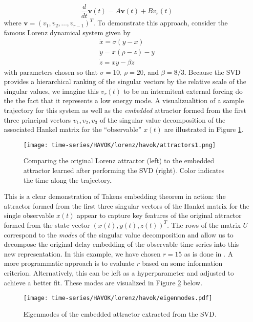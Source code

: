 \begin{equation}
  \frac{d}{dt}\mathbf{v}(t) = A\mathbf{v}(t) + Bv_r(t)
\end{equation}
where $\mathbf{v} = \left(v_1, v_2, ..., v_{r-1}\right)^T$. To demonstrate this approach, consider the famous Lorenz dynamical system given by
\begin{align}
  \dot{x} = \sigma(y-x) \\
  \dot{y} = x(\rho-z) -y \\
  \dot{z} = xy - \beta z
\end{align}
with parameters chosen so that $\sigma = 10$, $\rho=20$, and $\beta=8/3$. Because the SVD provides a hierarchical ranking of the singular vectors by the relative scale of the singular values, we imagine this $v_r(t)$ to be an intermitent external forcing do the the fact that it represents a low energy mode. A visualizualition of a sample trajectory for this system as well as the \textit{embedded} attractor formed from the first three principal vectors $v_1, v_2, v_3$ of the singular value decomposition of the associated Hankel matrix for the ``observable'' $x(t)$ are illustrated in Figure \ref{fig:lorenz-attractor}.
\begin{figure}[h]
  \centering
  \texttt{[image: time-series/HAVOK/lorenz/havok/attractors1.png]}
  \caption{Comparing the original Lorenz attractor (left) to the embedded attractor learned after performing the SVD (right). Color indicates the time along the trajectory.}
  \label{fig:lorenz-attractor}
\end{figure}

This is a clear demonstration of Takens embedding theorem in action: the attractor formed from the first three singular vectors of the Hankel matrix for the single observable $x(t)$ appear to capture key features of the original attractor formed from the state vector $(x(t), y(t), z(t))^T$. The rows of the matrix $U$ correspond to the \textit{modes} of the singular value decomposition and allow us to decompose the original delay embedding of the observable time series into this new representation. In this example, we have chosen $r=15$ as is done in \cite{brunton-havok}. A more programmatic approach is to evaluate $r$ based on some information criterion. Alternatively, this can be left as a hyperparameter and adjusted to achieve a better fit. These modes are visualized in Figure \ref{fig:lorenz-modes} below.

\begin{figure}[h!]
  \centering
  \texttt{[image: time-series/HAVOK/lorenz/havok/eigenmodes.pdf]}
  \caption{Eigenmodes of the embedded attractor extracted from the SVD.}
  \label{fig:lorenz-modes}
\end{figure}

